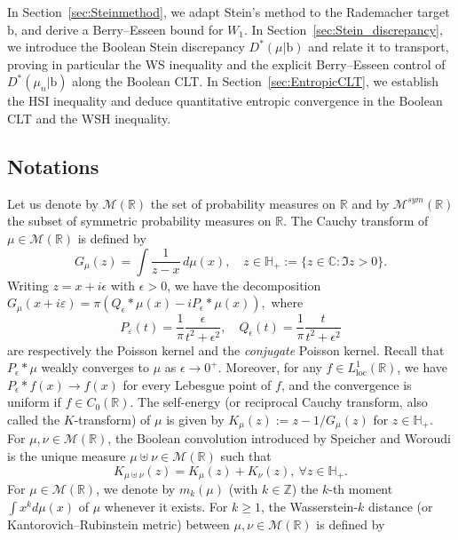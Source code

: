 \documentclass[10pt, reqno]{amsart}
\numberwithin{equation}{section}
\theoremstyle{definition}
\theoremstyle{plain}
\theoremstyle{remark}
\newcommand{\R}{\mathbb{R}}
\newcommand{\1}{\mathbbm{1}}
\begin{document}
In Section~\ref{sec:Steinmethod}, we adapt Stein’s method to the Rademacher target $\mathbb{\mathrm{b}}$, and derive a Berry--Esseen bound for $W_1$.
In Section~\ref{sec:Stein_discrepancy}, we introduce the Boolean Stein discrepancy $D^*(\mu|\mathbb{\mathrm{b}})$ and relate it to transport, proving in particular the WS inequality and the explicit Berry--Esseen control of $D^*(\mu_n|\mathbb{\mathrm{b}})$ along the Boolean CLT.
In Section~\ref{sec:EntropicCLT}, we establish the HSI inequality and deduce quantitative entropic convergence in the Boolean CLT and the WSH inequality.

\subsection*{Notations} Let us denote by 
$\mathcal{M}(\R)$ the set of probability measures on $\mathbb{R}$ and by $\mathcal{M}^{sym}(\R)$ the subset of symmetric probability measures on $\mathbb{R}$. The Cauchy transform of $\mu \in \mathcal{M}(\mathbb{R})$ is defined by
$$
G_{\mu}(z)=\int \frac{1}{z-x}\,d\mu(x),\quad z \in \mathbb{H}_+ := \{ z \in \mathbb{C} : \Im z > 0 \}.
$$
Writing $z = x + i\epsilon$ with $\epsilon > 0$, we have the decomposition $G_\mu(x+i\varepsilon) = \pi( Q_\epsilon \ast \mu(x) - i P_\epsilon\ast \mu(x)),$
where
$$
P_\varepsilon(t) = \frac{1}{\pi}\frac{\epsilon}{t^2+\epsilon^2} ,
\quad
Q_\epsilon(t) = \frac{1}{\pi}\frac{t}{t^2+\epsilon^2}
$$
are respectively the Poisson kernel and the \emph{conjugate} Poisson kernel. Recall that $P_\epsilon\ast \mu$ weakly converges to $\mu$ as $\epsilon\to 0^+$. Moreover, for any $f \in L^1_{\mathrm{loc}}(\mathbb{R})$, we have $P_\epsilon \ast f(x) \longrightarrow f(x)$ for every Lebesgue point of $f$, and the convergence is uniform if $f\in C_0(\R)$. The self-energy (or reciprocal Cauchy transform, also called the $K$-transform) of $\mu$ is given by $K_\mu(z):=z-1/G_{\mu}(z)$  for $z\in\mathbb{H}_+$. For $\mu,\nu\in \mathcal{M}(\R)$, the Boolean convolution  introduced by Speicher and Woroudi \cite{speicher1996boolean} is the unique measure $\mu\uplus \nu\in \mathcal{M}(\R)$ such that
\begin{equation*}
	K_{\mu\uplus \nu}(z)=K_{\mu}(z)+K_{\nu}(z),\ \forall z\in\mathbb{H}_+.
\end{equation*}
For $\mu\in \mathcal{M}(\R)$, we denote by $m_k(\mu)$ (with $k\in \mathbb{Z}$) the $k$-th moment $\int x^k d\mu(x)$ of $\mu$ whenever it exists. For $k\geq 1$, the Wasserstein-$k$ distance (or Kantorovich–Rubinstein metric) between $\mu,\nu\in \mathcal{M}(\R)$ is defined by
\end{document}
